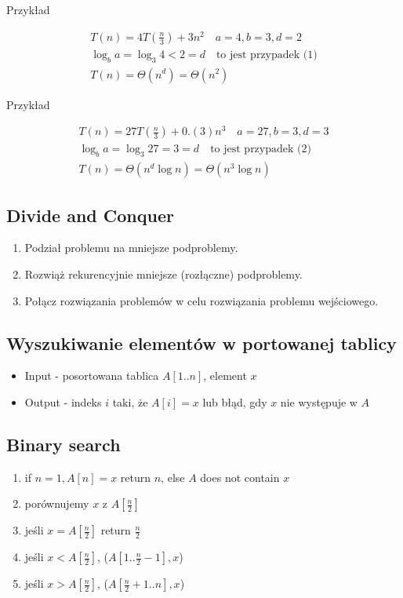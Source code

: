 \documentclass{article}
\numberwithin{equation}{subsection}
\begin{document}
\noindent
Przykład

\begin{align}
    T(n) = 4 T\left(\frac{n}{3}\right) + 3n^2 \quad a=4, b=3, d=2\\
    \log_b a = \log_3 4 < 2 = d \quad \text{to jest przypadek (1)}\\
    T(n) = \Theta\left(n^d\right) = \Theta\left(n^2\right)
\end{align}

\noindent
Przykład

\begin{align}
    T(n) = 27T\left(\frac{n}{3}\right) + 0.(3) n^3 \quad a=27, b=3, d=3\\
    \log_b a = \log_3 27 = 3 = d \quad \text{to jest przypadek (2)}\\
    T(n) = \Theta\left(n^d \log n\right) = \Theta\left(n^{3} \log n\right)
\end{align}

\subsection{Divide and Conquer}

\begin{enumerate}
    \item Podział problemu na mniejsze podproblemy.
    \item Rozwiąż rekurencyjnie mniejsze (rozłączne) podproblemy.
    \item Połącz rozwiązania problemów w celu rozwiązania problemu wejściowego.
\end{enumerate}

\subsection{Wyszukiwanie elementów w portowanej tablicy}

\begin{itemize}
    \item Input - posortowana tablica $A[1..n]$, element $x$
    \item Output - indeks $i$ taki, że $A[i] = x$ lub błąd, gdy $x$ nie występuje w $A$
\end{itemize}

\subsection{Binary search}

\begin{enumerate}
    \item if $n=1, A[n] = x$ return $n$, else $A$ does not contain $x$
    \item porównujemy $x$ z $A[\frac{n}{2}]$
    \item jeśli $x = A[\frac{n}{2}]$ return $\frac{n}{2}$
    \item jeśli $x < A[\frac{n}{2}]$, ($A[1..\frac{n}{2}-1], x$)
    \item jeśli $x > A[\frac{n}{2}]$, ($A[\frac{n}{2}+1..n], x$)
\end{enumerate}
\end{document}
